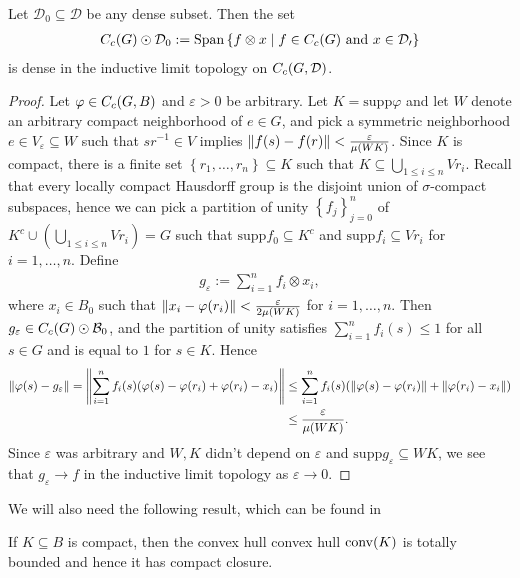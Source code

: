 \begin{lemma}
Let $\mathcal{D}_0 \subseteq \mathcal{D}$ be any dense subset. Then the set
\begin{align*}
	C_c(G) \odot \mathcal{D}_0 := \mathrm{Span}\left\{ f \otimes x \mid f \in C_c(G) \text{ and } x \in \mathcal{D_0} \right\} 
\end{align*}
is dense in the inductive limit topology on $C_c(G,\mathcal{D})$.
	\label{int:indlmdense}
\end{lemma}
\begin{proof}	
	Let $\varphi \in C_c(G,B)$ and $\varepsilon > 0$ be arbitrary. Let $K= \mathrm{supp} \varphi$ and let $W$ denote an arbitrary compact neighborhood of $e \in G$, and pick  a symmetric neighborhood $e \in V_{\varepsilon} \subseteq W$ such that $sr^{-1} \in V$ implies $\left\lVert f(s) - f(r) \right\rVert < \frac{\varepsilon}{\mu(WK)}$. Since $K$ is compact, there is a finite set $\left\{ r_1,\dots,r_n \right\} \subseteq K$ such that $K \subseteq \bigcup_{1 \leq i \leq n} V r_i$. Recall that every locally compact Hausdorff group is the disjoint union of $\sigma$-compact subspaces, hence we can pick a partition of unity $\left\{ f_j \right\}_{j=0}^n$ of $K^c \cup \left( \bigcup_{1 \leq i \leq n} Vr_i\right)=G$ such that $\mathrm{supp}f_0 \subseteq K^c$ and $\mathrm{supp}f_i \subseteq V r_i$ for $i = 1 ,\dots,n$. Define
	\begin{align*}
		g_\varepsilon := \sum_{i=1}^n f_i \otimes x_i,
	\end{align*}
	where $x_i \in B_0$ such that $\left\lVert x_i - \varphi(r_i)\right\rVert < \frac{\varepsilon}{2\mu(WK)}$ for $i = 1,\dots,n$. Then $g_\varepsilon \in C_c(G) \odot \mathcal{B}_0$, and the partition of unity satisfies $\sum_{i=1}^n f_i(s) \leq 1$ for all $s \in G$ and is equal to $1$ for $s \in K$. Hence
	\begin{align*}
		\left\lVert\varphi(s) - g_{\varepsilon}\right\rVert = \left\lVert \sum_{i=1}^n f_i(s)(\varphi(s) - \varphi(r_i)+\varphi(r_i)-x_i)\right\rVert &\leq \sum_{i=1}^n f_i(s) (\left\lVert \varphi(s) - \varphi(r_i)\right\rVert+\left\lVert \varphi(r_i)-x_i\right\rVert) \\
		&\leq \frac{\varepsilon}{\mu(WK)}.
	\end{align*}
	Since $\varepsilon$ was arbitrary and $W,K$ didn't depend on $\varepsilon$ and $ \mathrm{supp} g_\varepsilon \subseteq WK$, we see that $g_\varepsilon \to f$ in the inductive limit topology as $\varepsilon \to 0$.
\end{proof}
We will also need the following result, which can be found in \cite[Theorem 3.20, part (b, c)]{rudin1991functional}
\begin{lemma}
	If $K \subseteq B$ is compact, then the convex hull convex hull $\operatorname{conv}(K)$ is totally bounded and hence it has compact closure.
	\label{int:clconvcomp}
\end{lemma}



